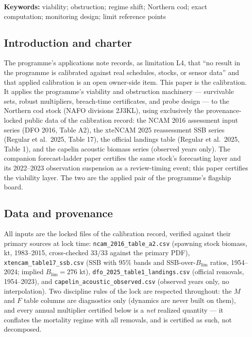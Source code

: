 \documentclass[10pt,twocolumn]{article}
\theoremstyle{plain}
\theoremstyle{remark}
\begin{document}
\textbf{Keywords:} viability; obstruction; regime shift; Northern cod;
exact computation; monitoring design; limit reference points

\subsection{Introduction and charter}\label{intro}

The programme's applications note records, as limitation L4, that ``no
result in the programme is calibrated against real schedules, stocks, or
sensor data'' and that applied calibration is an open owner-side item.
This paper is the calibration. It applies the programme's viability and
obstruction machinery --- survivable sets, robust multipliers,
breach-time certificates, and probe design --- to the Northern cod stock
(NAFO divisions 2J3KL), using exclusively the provenance-locked public
data of the calibration record: the NCAM 2016 assessment input series
(DFO 2016, Table A2), the xteNCAM 2025 reassessment SSB series (Regular
et al.\ 2025, Table 17), the official landings table (Regular et al.\
2025, Table 1), and the capelin acoustic biomass series (observed years
only). The companion forecast-ladder paper certifies the same stock's
forecasting layer and its 2022--2023 observation suspension as a
review-timing event; this paper certifies the viability layer. The two
are the applied pair of the programme's flagship board.

\subsection{Data and provenance}\label{data}

All inputs are the locked files of the calibration record, verified
against their primary sources at lock time: \texttt{ncam\_2016\_table\_a2.csv}
(spawning stock biomass, kt, 1983--2015, cross-checked 33/33 against the
primary PDF), \texttt{xtencam\_table17\_ssb.csv} (SSB with \(95\%\)
bands and SSB-over-\(B_{\mathrm{lim}}\) ratios, 1954--2024; implied
\(B_{\mathrm{lim}} = 276\) kt), \texttt{dfo\_2025\_table1\_landings.csv}
(official removals, 1954--2023), and
\texttt{capelin\_acoustic\_observed.csv} (observed years only, no
interpolation). Two discipline rules of the lock are respected
throughout: the \(M\) and \(F\) table columns are diagnostics only
(dynamics are never built on them), and every annual multiplier
certified below is a \emph{net} realized quantity --- it conflates the
mortality regime with all removals, and is certified as such, not
decomposed.
\end{document}
